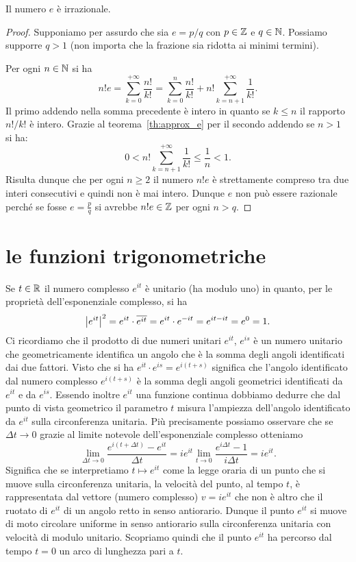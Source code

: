 \begin{theorem}[irrazionalità di $e$]
%
\mymark{**}%
%
%
Il numero $e$ è irrazionale.
\end{theorem}
%
\begin{proof}
Supponiamo per assurdo che sia $e=p/q$ con $p\in {\mathbb Z}$ e $q \in {\mathbb N}$.
Possiamo supporre $q>1$
(non importa che la frazione sia ridotta ai minimi termini).

Per ogni $n\in {\mathbb N}$ si ha 
\[
  n! e = \sum_{k=0}^{+\infty} \frac{n!}{k!}
   = \sum_{k=0}^n \frac{n!}{k!} + n!\sum_{k=n+1}^{+\infty} \frac{1}{k!}.
\]
Il primo addendo nella somma precedente è intero
in quanto se $k\le n$ il rapporto $n!/k!$ è intero.
Grazie al teorema~\ref{th:approx_e}
per il secondo addendo se $n>1$ si ha:
\[
0 < n! \sum_{k=n+1}^{+\infty} \frac{1}{k!}
\le \frac{1}{n} < 1.
\]
Risulta dunque che per ogni $n\ge 2$ il numero $n! e$
è strettamente compreso tra due interi consecutivi e quindi non 
è mai intero. Dunque $e$ non può essere razionale perché 
se fosse $e=\frac p q$ si avrebbe $n! e \in {\mathbb Z}$ per ogni 
$n>q$.
\end{proof}


\section{le funzioni trigonometriche}
Se $t\in {\mathbb R}$ il numero complesso $e^{it}$ è unitario (ha modulo uno)
in quanto, per le proprietà dell'esponenziale complesso, si ha
\[
{\left|e^{it}\right|}^2 
  = e^{it}\cdot \overline{e^{it}}  
  = e^{it}\cdot e^{-it} = e^{it-it} = e^0 = 1.
\]
Ci ricordiamo che il prodotto di due numeri unitari $e^{it}$,
$e^{is}$
è un numero unitario che geometricamente identifica un angolo 
che è la somma degli angoli identificati dai due fattori.
Visto che si ha $e^{it}\cdot e^{is} = e^{i(t+s)}$ significa 
che l'angolo identificato dal numero complesso $e^{i(t+s)}$
è la somma degli angoli geometrici identificati da $e^{it}$ e da $e^{is}$.
Essendo inoltre $e^{it}$ una funzione continua dobbiamo 
dedurre che dal punto di vista geometrico il parametro $t$ 
misura l'ampiezza dell'angolo identificato da $e^{it}$ 
sulla circonferenza unitaria. 
Più precisamente possiamo osservare che se $\Delta t\to 0$ 
grazie al limite notevole dell'esponenziale complesso otteniamo 
\[
\lim_{\Delta t\to 0 }\frac{e^{i(t+\Delta t)} - e^{it}}{\Delta t}
= i e^{it} \lim_{t\to 0}\frac{e^{i\Delta t} - 1}{i \Delta t}
= i e^{it}.
\]
Significa che se interpretiamo $t\mapsto e^{it}$ come la legge oraria 
di un punto che si muove sulla circonferenza unitaria, 
la velocità del punto, al tempo $t$, è rappresentata dal 
vettore (numero complesso) $v = ie^{it}$ che non è altro che il ruotato 
di $e^{it}$ di un angolo retto in senso antiorario.
Dunque il punto $e^{it}$ si muove di moto circolare uniforme 
in senso antiorario sulla circonferenza unitaria 
con velocità di modulo unitario.
Scopriamo quindi che il punto $e^{it}$ ha percorso dal tempo $t=0$ 
un arco di lunghezza pari a $t$.

